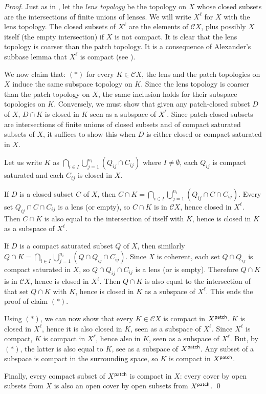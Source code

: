 \documentclass[preprint,12pt]{elsarticle}
\newcommand\patch{{\text{\textsf{patch}}}}
\begin{document}
\begin{proof}
  Just as in \cite[Lemma~7.1]{KL:measureext}, let the \emph{lens
    topology} be the topology on $X$ whose closed subsets are the
  intersections of finite unions of lenses.  We will write $X^\ell$
  for $X$ with the lens topology.  The closed subsets of $X^\ell$ are
  the elements of $\mathcal C X$, plus possibly $X$ itself (the empty
  intersection) if $X$ is not compact.  It is clear that the lens
  topology is coarser than the patch topology.  It is a consequence of
  Alexander's subbase lemma that $X^\ell$ is compact (see
  \cite[Lemma~7.1~(2)]{KL:measureext}).

  We now claim that: $(*)$ for every $K \in \mathcal C X$, the lens
  and the patch topologies on $X$ induce the same subspace topology on
  $K$.  Since the lens topology is coarser than the patch topology on
  $X$, the same inclusion holds for their subspace topologies on $K$.
  Conversely, we must show that given any patch-closed subset $D$ of
  $X$, $D \cap K$ is closed in $K$ seen as a subspace of $X^\ell$.
  Since patch-closed subsets are intersections of finite unions of
  closed subsets and of compact saturated subsets of $X$, it suffices
  to show this when $D$ is either closed or compact saturated in $X$.

  Let us write $K$ as
  $\bigcap_{i \in I} \bigcup_{j=1}^{n_i} (Q_{ij} \cap C_{ij})$ where
  $I \neq \emptyset$, each $Q_{ij}$ is compact saturated and each
  $C_{ij}$ is closed in $X$.
  
  If $D$ is a closed subset $C$ of $X$, then
  $C \cap K = \bigcap_{i \in I} \bigcup_{j=1}^{n_i} (Q_{ij} \cap C
  \cap C_{ij})$.  Every set $Q_{ij} \cap C \cap C_{ij}$ is a lens (or
  empty), so $C \cap K$ is in $\mathcal C X$, hence closed in
  $X^\ell$.  Then $C \cap K$ is also equal to the intersection of
  itself with $K$, hence is closed in $K$ as a subspace of $X^\ell$.

  If $D$ is a compact saturated subset $Q$ of $X$, then similarly
  $Q \cap K = \bigcap_{i \in I} \bigcup_{j=1}^{n_i} (Q \cap Q_{ij}
  \cap C_{ij})$.  Since $X$ is coherent, each set $Q \cap Q_{ij}$ is
  compact saturated in $X$, so $Q \cap Q_{ij} \cap C_{ij}$ is a lens
  (or is empty).  Therefore $Q \cap K$ is in $\mathcal C X$, hence is
  closed in $X^\ell$.  Then $Q \cap K$ is also equal to the
  intersection of that set $Q \cap K$ with $K$, hence is closed in $K$
  as a subspace of $X^\ell$.  This ends the proof of claim $(*)$.

  Using $(*)$, we can now show that every $K \in \mathcal C X$ is
  compact in $X^\patch$.  $K$ is closed in $X^\ell$, hence it is also
  closed in $K$, seen as a subspace of $X^\ell$.  Since $X^\ell$ is
  compact, $K$ is compact in $X^\ell$, hence also in $K$, seen as a
  subspace of $X^\ell$.  But, by $(*)$, the latter is also equal to
  $K$, see as a subspace of $X^\patch$.  Any subset of a subspace is
  compact in the surrounding space, so $K$ is compact in $X^\patch$.

  Finally, every compact subset of $X^\patch$ is compact in $X$: every
  cover by open subsets from $X$ is also an open cover by open subsets
  from $X^\patch$.  \qed
\end{proof}
\end{document}
